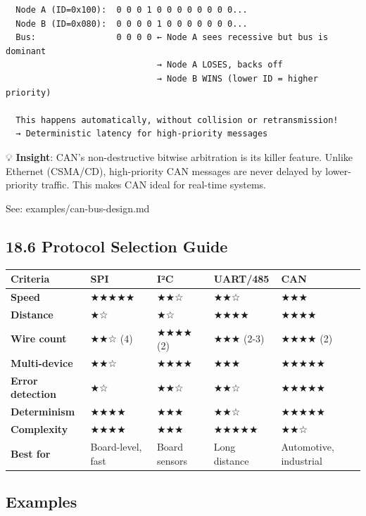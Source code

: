 \documentclass[11pt,a4paper]{book}
\begin{document}
\begin{itemize}
\begin{lstlisting}
  Node A (ID=0x100):  0 0 0 1 0 0 0 0 0 0 0 0...
  Node B (ID=0x080):  0 0 0 0 1 0 0 0 0 0 0 0...
  Bus:                0 0 0 0 ← Node A sees recessive but bus is dominant
                              → Node A LOSES, backs off
                              → Node B WINS (lower ID = higher priority)
  
  This happens automatically, without collision or retransmission!
  → Deterministic latency for high-priority messages
\end{lstlisting}

💡 \textbf{Insight}: CAN's non-destructive bitwise arbitration is its killer feature. Unlike Ethernet (CSMA/CD), high-priority CAN messages are never delayed by lower-priority traffic. This makes CAN ideal for real-time systems.

See: examples/can-bus-design.md

\medskip\noindent\hrulefill\medskip

\subsection{18.6 Protocol Selection Guide}

\begin{center}
\begin{tabular}{|l|l|l|l|l|}
\hline
Criteria & SPI & I²C & UART/485 & CAN \\
\hline
\textbf{Speed} & ★★★★★ & ★★☆ & ★★☆ & ★★★ \\
\textbf{Distance} & ★☆ & ★☆ & ★★★★ & ★★★★ \\
\textbf{Wire count} & ★★☆ (4) & ★★★★ (2) & ★★★ (2-3) & ★★★★ (2) \\
\textbf{Multi-device} & ★★☆ & ★★★★ & ★★★ & ★★★★★ \\
\textbf{Error detection} & ★☆ & ★★☆ & ★★☆ & ★★★★★ \\
\textbf{Determinism} & ★★★★ & ★★★ & ★★☆ & ★★★★★ \\
\textbf{Complexity} & ★★★★ & ★★★ & ★★★★★ & ★★☆ \\
\textbf{Best for} & Board-level, fast & Board sensors & Long distance & Automotive, industrial \\
\hline
\end{tabular}
\end{center}

\medskip\noindent\hrulefill\medskip

\subsection{Examples}


\end{itemize}
\end{document}
